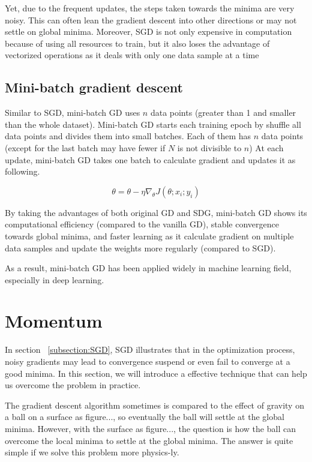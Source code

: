 	Yet, due to the frequent updates, the steps taken towards the minima are very noisy. This can often lean the gradient descent into other directions or may not settle on global minima. Moreover, SGD is not only expensive in computation because of using all resources to train, but it also loses the advantage of vectorized operations as it deals with only one data sample at a time
	
	
	\subsection{Mini-batch gradient descent}
	\label{subsection:minibatchGD}
	\noindent
	
	Similar to SGD, mini-batch GD uses $n$ data points (greater than 1 and smaller than the whole dataset). Mini-batch GD starts each training epoch by shuffle all data points and divides them into small batches. Each of them has $n$ data points (except for the last batch may have fewer if $N$ is not divisible to $n$) At each update, mini-batch GD takes one batch to calculate gradient and updates it as following.
	
	\[ \theta = \theta - \eta \nabla_{\theta} J(\theta; x_i; y_i) \]
	
	\noindent
	By taking the advantages of both original GD and SDG, mini-batch GD shows its computational efficiency (compared to the vanilla GD), stable convergence towards global minima, and faster learning as it calculate gradient on multiple data samples and update the weights more regularly (compared to SGD).
	
	As a result, mini-batch GD has been applied widely in machine learning field, especially in deep learning.

\section{Momentum}
\noindent
	
	In section ~\ref{subsection:SGD}, SGD illustrates that in the optimization process, noisy gradients may lead to convergence suspend or even fail to converge at a good minima. In this section, we will introduce a effective technique that can help us overcome the problem in practice.
	
	The gradient descent algorithm sometimes is compared to the effect of gravity on a ball on a surface as figure..., so eventually the ball will settle at the global minima. However, with the surface as figure..., the question is how the ball can overcome the local minima to settle at the global minima. The answer is quite simple if we solve this problem more physics-ly.
	
